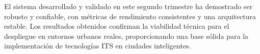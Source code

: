 \documentclass[onecolumn]{article}
\begin{document}
El sistema desarrollado y validado en este segundo trimestre ha demostrado ser robusto y confiable, con métricas de rendimiento consistentes y una arquitectura estable. Los resultados obtenidos confirman la viabilidad técnica para el despliegue en entornos urbanos reales, proporcionando una base sólida para la implementación de tecnologías ITS en ciudades inteligentes.
\end{document}

